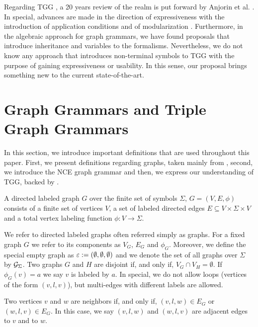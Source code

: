 \documentclass[runningheads]{llncs}
\begin{document}
Regarding TGG \cite{schurr1994specification}, a 20 years review of the realm is put forward by Anjorin et al. \cite{anjorin201620}. In special, advances are made in the direction of expressiveness with the introduction of application conditions \cite{klar2010extended} and of modularization \cite{anjorin2014modularizing}. Furthermore, in the algebraic approach for graph grammars, we have found proposals that introduce inheritance \cite{bardohl2004integrating,hermann2008typed} and variables \cite{hoffmann2005graph} to the formalisms. Nevertheless, we do not know any approach that introduces non-terminal symbols to TGG with the purpose of gaining expressiveness or usability. In this sense, our proposal brings something new to the current state-of-the-art.

\section{Graph Grammars and Triple Graph Grammars}
\label{sec:gg-tgg}
In this section, we introduce important definitions that are used throughout this paper. First, we present definitions regarding graphs, taken mainly from \cite{rozenberg1986boundary}, second, we introduce the NCE graph grammar \cite{janssens1982graph,kim2001efficient} and then, we express our understanding of TGG, backed by \cite{schurr1994specification}.

\begin{definition}
	\label{def:graph}
	A directed labeled graph $G$ over the finite set of symbols $\Sigma$, $G = (V, E, \phi)$ consists of a finite set of vertices $V$, a set of labeled directed edges $E \subseteq V \times \Sigma \times V$ and a total vertex labeling function $\phi : V \to \Sigma$. 
\end{definition}

We refer to directed labeled graphs often referred simply as graphs. For a fixed graph $G$ we refer to its components as $V_G$, $E_G$ and $\phi_G$. Moreover, we define the special empty graph as $\varepsilon := (\emptyset, \emptyset, \emptyset)$ and we denote the set of all graphs over $\Sigma$ by $\mathcal{G}_{\Sigma}$. Two graphs $G$ and $H$ are disjoint if, and only if, $V_G \cap V_H = \emptyset$. If $\phi_G(v) = a$ we say $v$ is labeled by $a$. In special, we do not allow loops (vertices of the form $(v,l,v)$), but multi-edges with different labels are allowed.

Two vertices $v$ and $w$ are neighbors if, and only if, $(v,l,w) \in E_G$ or $(w,l,v) \in E_G$. In this case, we say $(v,l,w)$ and $(w,l,v)$ are adjacent edges to $v$ and to $w$.
\end{document}
